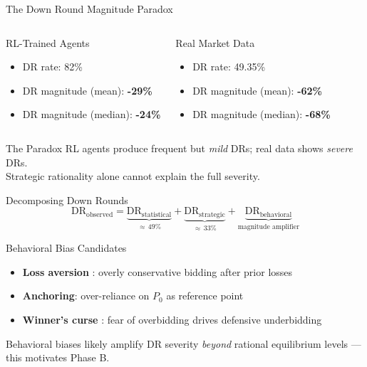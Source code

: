 \documentclass[aspectratio=169]{beamer}
\begin{document}
\begin{frame}{The Down Round Magnitude Paradox}
  \begin{columns}[T]
    \begin{block}{RL-Trained Agents}
      \begin{itemize}
        \item DR rate: 82\%
        \item DR magnitude (mean): \textbf{-29\%}
        \item DR magnitude (median): \textbf{-24\%}
      \end{itemize}
    \end{block}

    \begin{block}{Real Market Data}
      \begin{itemize}
        \item DR rate: 49.35\%
        \item DR magnitude (mean): \textbf{-62\%}
        \item DR magnitude (median): \textbf{-68\%}
      \end{itemize}
    \end{block}
  \end{columns}

  \vspace{0.3cm}
  \begin{block}{The Paradox}
    RL agents produce frequent but \emph{mild} DRs; real data shows \emph{severe} DRs.\\
    Strategic rationality alone cannot explain the full severity.
  \end{block}
\end{frame}

\begin{frame}{Decomposing Down Rounds}
  \begin{equation*}
    \text{DR}_{\text{observed}} = \underbrace{\text{DR}_{\text{statistical}}}_{\approx\,49\%}
    + \underbrace{\text{DR}_{\text{strategic}}}_{\approx\,33\%}
    + \underbrace{\text{DR}_{\text{behavioral}}}_{\text{magnitude amplifier}}
  \end{equation*}

  \vspace{0.3cm}
  \begin{block}{Behavioral Bias Candidates}
    \begin{itemize}
      \item \textbf{Loss aversion} \citep{kahneman1979}: overly conservative bidding after prior losses
      \item \textbf{Anchoring}: over-reliance on $P_0$ as reference point
      \item \textbf{Winner's curse} \citep{thaler1988}: fear of overbidding drives defensive underbidding
    \end{itemize}
  \end{block}

  \vspace{0.2cm}
  Behavioral biases likely amplify DR severity \emph{beyond} rational equilibrium levels --- this motivates Phase B.
\end{frame}
\end{document}
